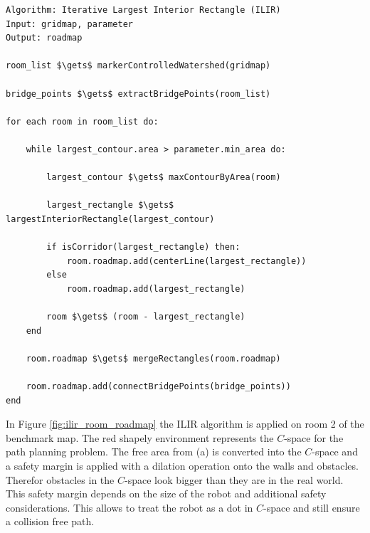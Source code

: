 \begin{lstlisting}[float=h]
Algorithm: Iterative Largest Interior Rectangle (ILIR)
Input: gridmap, parameter
Output: roadmap

room_list $\gets$ markerControlledWatershed(gridmap)

bridge_points $\gets$ extractBridgePoints(room_list)

for each room in room_list do:

    while largest_contour.area > parameter.min_area do:
    
        largest_contour $\gets$ maxContourByArea(room)
            
        largest_rectangle $\gets$ largestInteriorRectangle(largest_contour)

        if isCorridor(largest_rectangle) then:
            room.roadmap.add(centerLine(largest_rectangle))
        else
            room.roadmap.add(largest_rectangle)

        room $\gets$ (room - largest_rectangle)
    end

    room.roadmap $\gets$ mergeRectangles(room.roadmap)
    
    room.roadmap.add(connectBridgePoints(bridge_points))
end
\end{lstlisting}

In Figure \ref{fig:ilir_room_roadmap} the ILIR algorithm is applied on room 2 of the benchmark map. The red shapely environment represents the \(C\)-space for the path planning problem. The free area from (a) is converted into the \(C\)-space and a safety margin is applied with a dilation operation onto the walls and obstacles.  Therefor obstacles in the \(C\)-space look bigger than they are in the real world. This safety margin depends on the size of the robot and additional safety considerations. This allows to treat the robot as a dot in \(C\)-space and still ensure a collision free path. 

